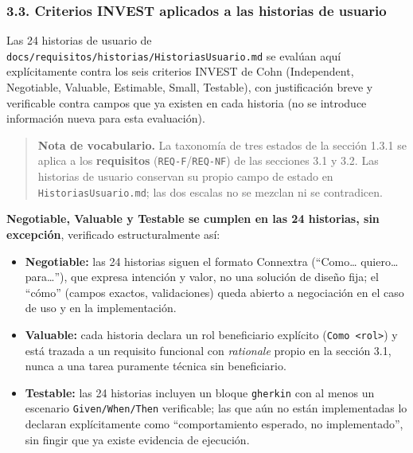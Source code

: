\documentclass[
  spanish,
]{article}
\providecommand{\tightlist}{%
  \setlength{\itemsep}{0pt}\setlength{\parskip}{0pt}}
\begin{document}
\subsubsection{3.3. Criterios INVEST aplicados a las historias de
usuario}\label{criterios-invest-aplicados-a-las-historias-de-usuario}

Las 24 historias de usuario de
\texttt{docs/\allowbreak{}requisitos/\allowbreak{}historias/\allowbreak{}Historias\allowbreak{}Usuario.\allowbreak{}md} se evalúan aquí
explícitamente contra los seis criterios INVEST de Cohn (Independent,
Negotiable, Valuable, Estimable, Small, Testable), con justificación
breve y verificable contra campos que ya existen en cada historia (no se
introduce información nueva para esta evaluación).

\begin{quote}
\textbf{Nota de vocabulario.} La taxonomía de tres estados de la sección
1.3.1 se aplica a los \textbf{requisitos}
(\texttt{REQ-\allowbreak{}F}/\texttt{REQ-\allowbreak{}NF}) de las secciones 3.1 y 3.2. Las
historias de usuario conservan su propio campo de estado en
\texttt{Historias\allowbreak{}Usuario.\allowbreak{}md}; las dos escalas no se mezclan ni se
contradicen.
\end{quote}

\textbf{Negotiable, Valuable y Testable se cumplen en las 24 historias,
sin excepción}, verificado estructuralmente así:

\begin{itemize}
\tightlist
\item
  \textbf{Negotiable:} las 24 historias siguen el formato Connextra
  (``Como\ldots{} quiero\ldots{} para\ldots{}''), que expresa intención
  y valor, no una solución de diseño fija; el ``cómo'' (campos exactos,
  validaciones) queda abierto a negociación en el caso de uso y en la
  implementación.
\item
  \textbf{Valuable:} cada historia declara un rol beneficiario explícito
  (\texttt{Como\ \textless{}rol\textgreater{}}) y está trazada a un
  requisito funcional con \emph{rationale} propio en la sección 3.1,
  nunca a una tarea puramente técnica sin beneficiario.
\item
  \textbf{Testable:} las 24 historias incluyen un bloque
  \texttt{gherkin} con al menos un escenario \texttt{Given/\allowbreak{}When/\allowbreak{}Then}
  verificable; las que aún no están implementadas lo declaran
  explícitamente como ``comportamiento esperado, no implementado'', sin
  fingir que ya existe evidencia de ejecución.
\end{itemize}
\end{document}
